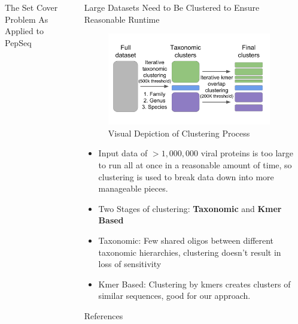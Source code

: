 \documentclass[final]{beamer}
\newlength{\sepwidth}
\newlength{\colwidth}
\newcommand{\separatorcolumn}{\begin{column}{\sepwidth}\end{column}}
\begin{document}
\begin{frame}[t]
\begin{columns}[t]
\begin{column}{\colwidth}
\begin{block}{The Set Cover Problem As Applied to PepSeq}
\end{block}

\end{column}

\separatorcolumn


\begin{column}{\colwidth}
  \begin{block}{Large Datasets Need to Be Clustered to Ensure Reasonable Runtime}
    \begin{figure}
      \includegraphics[width=0.6\colwidth]{figures/clustering.png}
      \caption{Visual Depiction of Clustering Process}
      \label{fig:clustering}
    \end{figure}
    \begin{itemize}
    \item Input data of $>1,000,000$ viral proteins is too large to run all at once in a reasonable amount of time,
      so clustering is used to break data down into more manageable pieces.
    \item Two Stages of clustering: \textbf{Taxonomic} and \textbf{Kmer Based}
    \item Taxonomic: Few shared oligos between different taxonomic hierarchies,
      clustering doesn't result in loss of sensitivity
    \item Kmer Based: Clustering by kmers creates clusters of similar sequences,
      good for our approach.
    \end{itemize}

  \end{block}


  \begin{block}{References}

    \nocite{*}
    \footnotesize{}

  \end{block}

\end{column}

\separatorcolumn
\end{columns}
\end{frame}
\end{document}
